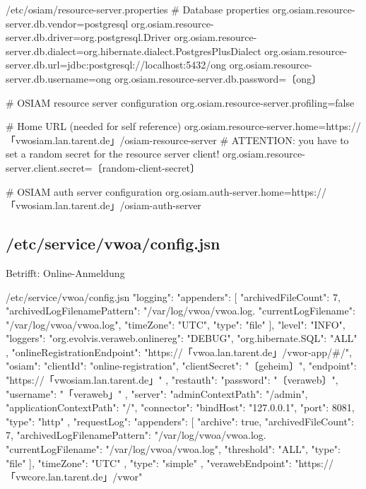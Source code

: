 \begin{lstdump}{/etc/osiam/resource-server.properties}
# Database properties
org.osiam.resource-server.db.vendor=postgresql
org.osiam.resource-server.db.driver=org.postgresql.Driver
org.osiam.resource-server.db.dialect=org.hibernate.dialect.PostgresPlusDialect
org.osiam.resource-server.db.url=jdbc:postgresql://localhost:5432/ong
org.osiam.resource-server.db.username=ong
org.osiam.resource-server.db.password=〔ong〕

# OSIAM resource server configuration
org.osiam.resource-server.profiling=false

# Home URL (needed for self reference)
org.osiam.resource-server.home=https://「vwosiam.lan.tarent.de」/osiam-resource-server
# ATTENTION: you have to set a random secret for the resource server client!
org.osiam.resource-server.client.secret=〔random-client-secret〕

# OSIAM auth server configuration
org.osiam.auth-server.home=https://「vwosiam.lan.tarent.de」/osiam-auth-server
\end{lstdump}

\subsection{/etc/service/vwoa/config.jsn}\label{subsec:refcfg-oa-cfg}

Betrifft: Online-Anmeldung

\begin{lstdump}{/etc/service/vwoa/config.jsn}
{
  "logging": {
    "appenders": [
      {
        "archivedFileCount": 7,
        "archivedLogFilenamePattern": "/var/log/vwoa/vwoa.log.%
        "currentLogFilename": "/var/log/vwoa/vwoa.log",
        "timeZone": "UTC",
        "type": "file"
      }
    ],
    "level": "INFO",
    "loggers": {
      "org.evolvis.veraweb.onlinereg": "DEBUG",
      "org.hibernate.SQL": "ALL"
    }
  },
  "onlineRegistrationEndpoint": "https://「vwoa.lan.tarent.de」/vwor-app/#/",
  "osiam": {
    "clientId": "online-registration",
    "clientSecret": "〔geheim〕",
    "endpoint": "https://「vwosiam.lan.tarent.de」"
  },
  "restauth": {
    "password": "〔veraweb〕",
    "username": "「veraweb」"
  },
  "server": {
    "adminContextPath": "/admin",
    "applicationContextPath": "/",
    "connector": {
      "bindHost": "127.0.0.1",
      "port": 8081,
      "type": "http"
    },
    "requestLog": {
      "appenders": [
        {
          "archive": true,
          "archivedFileCount": 7,
          "archivedLogFilenamePattern": "/var/log/vwoa/vwoa.log.%
          "currentLogFilename": "/var/log/vwoa/vwoa.log",
          "threshold": "ALL",
          "type": "file"
        }
      ],
      "timeZone": "UTC"
    },
    "type": "simple"
  },
  "verawebEndpoint": "https://「vwcore.lan.tarent.de」/vwor"
}
\end{lstdump}

